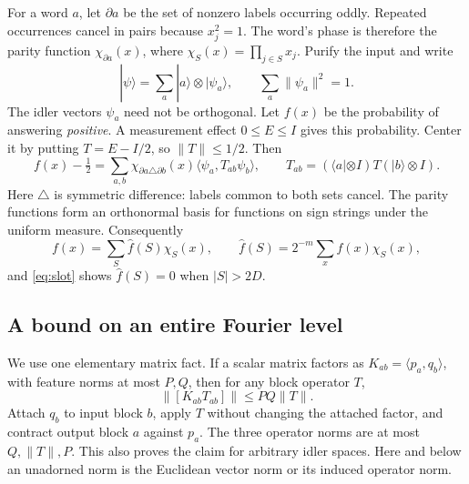 \documentclass[11pt]{article}
\newcommand{\wh}{\widehat}
\newcommand{\1}{\mathbf 1}
\begin{document}
For a word $a$, let $\partial a$ be the set of nonzero labels occurring
oddly. Repeated occurrences cancel in pairs because $x_j^2=1$.
The word's phase is therefore the parity function
$\chi_{\partial a}(x)$, where $\chi_S(x)=\prod_{j\in S}x_j$.
Purify the input and write
\[
 |\psi\rangle=\sum_a|a\rangle\otimes|\psi_a\rangle,\qquad
 \sum_a\|\psi_a\|^2=1.
\]
The idler vectors $\psi_a$ need not be orthogonal.
Let $f(x)$ be the probability of answering \emph{positive}. A measurement
effect $0\le E\le I$ gives this probability. Center it by putting
$T=E-I/2$, so $\|T\|\le1/2$. Then
\begin{equation}\label{eq:slot}
 f(x)-\tfrac12=\sum_{a,b}\chi_{\partial a\triangle\partial b}(x)
                  \langle\psi_a,T_{ab}\psi_b\rangle,\qquad
 T_{ab}=(\langle a|\otimes I)T(|b\rangle\otimes I).
\end{equation}
Here $\triangle$ is symmetric difference: labels common to both sets
cancel. The parity functions form an orthonormal basis for functions
on sign strings under the uniform measure. Consequently
\[
 f(x)=\sum_S\wh f(S)\chi_S(x),\qquad
 \wh f(S)=2^{-m}\sum_x f(x)\chi_S(x),
\]
and \eqref{eq:slot} shows $\wh f(S)=0$ when $|S|>2D$.

\subsection{A bound on an entire Fourier level}
We use one elementary matrix fact. If a scalar matrix factors as
$K_{ab}=\langle p_a,q_b\rangle$, with feature norms at most $P,Q$,
then for any block operator $T$,
\begin{equation}\label{eq:schur}
                   \|[K_{ab}T_{ab}]\|\le PQ\|T\|.
\end{equation}
Attach $q_b$ to input block $b$, apply $T$ without changing the attached
factor, and contract output block $a$ against $p_a$. The three operator
norms are at most $Q,\|T\|,P$. This also proves the claim for arbitrary
idler spaces. Here and below an unadorned norm is the Euclidean vector
norm or its induced operator norm.
\end{document}
